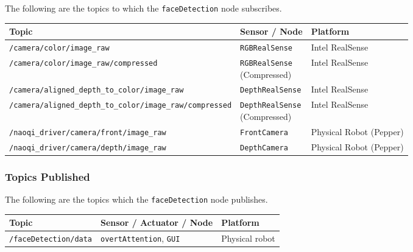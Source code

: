 \documentclass{CSSRforAfrica}
\begin{document}
{\newpage

The following are the topics to which the \texttt{\small faceDetection}  node subscribes.

\begin{table}[!h]
	\centering
	{\fontsize{8.2}{11.0}\selectfont %
		\begin{tabularx}{\linewidth}{| l | l | X |}
			\hline
			\small{Topic} & \small{Sensor / Node} & \small{Platform} \\
			\hline
			\texttt{/camera/color/image\_raw} & \texttt{RGBRealSense} & Intel RealSense \\
			\hline
			\texttt{/camera/color/image\_raw/compressed} & \makecell[l]{\texttt{RGBRealSense} \\ (Compressed)} & Intel RealSense \\
			\hline
			\texttt{/camera/aligned\_depth\_to\_color/image\_raw} & \texttt{DepthRealSense} & Intel RealSense \\
			\hline
			\texttt{/camera/aligned\_depth\_to\_color/image\_raw/compressed} & \makecell[l]{\texttt{DepthRealSense} \\ (Compressed)} & Intel RealSense \\
			\hline
			\texttt{/naoqi\_driver/camera/front/image\_raw} & \texttt{FrontCamera} & Physical Robot (Pepper) \\
			\hline
			\texttt{/naoqi\_driver/camera/depth/image\_raw} & \texttt{DepthCamera} & Physical Robot (Pepper) \\
			\hline
		\end{tabularx}
	}
\end{table}



\subsubsection*{Topics Published}

The following are the topics which the \small \texttt{faceDetection}   node publishes.
 
\begin{center}
\begin{tabularx}{\linewidth}{| l | l | X|}
\hline 
{\small Topic }                                                                                & {\small Sensor / Actuator / Node}    &  {\small Platform}       \\
\hline
{\footnotesize \verb+/faceDetection/data+ }  & {\footnotesize \verb+overtAttention+, \verb+GUI+ } & {\small Physical robot} \\ 
\hline
\end{tabularx}
\end{center}

}
\end{document}
